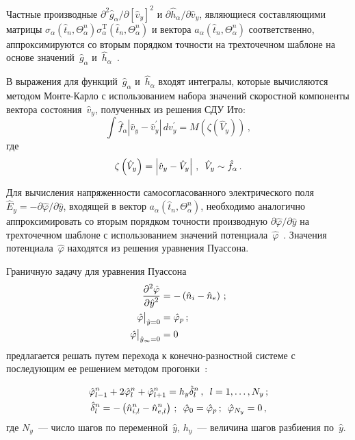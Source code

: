 \begin{multicols}{2}
Частные производные $\partial^2\hat{g}_\alpha/\partial[\hat{v}_y]^2$ и $\partial \hat{h}_\alpha/\partial 
\hat{v}_y$, являющиеся составляющими матрицы $\sigma_\alpha (\hat{t}_n, 
\Theta_\alpha^n)\sigma_\alpha^{\mathrm{T}}(\hat{t}_n,\Theta_\alpha^n)$ и вектора $a_\alpha(\hat{t}_n, 
\Theta_\alpha^n)$ соответственно, аппроксимируются со вторым порядком точности на трехточечном 
шаблоне на основе значений~$\hat{g}_\alpha$ и~$\hat{h}_\alpha$~\cite{17-k}.
      
      В выражения для функций~$\hat{g}_\alpha$ и~$\hat{h}_\alpha$ входят интегралы, которые 
вычисляются методом Мон\-те-Кар\-ло с использованием набора значений скоростной компоненты 
вектора состояния~$\hat{v}_y$, полученных из решения СДУ Ито:
      \begin{equation*}
      \int \hat{f}_\alpha \left\vert \hat{v}_y-
\hat{v}_y^\prime\right\vert\,dv_y^\prime=M\left(\zeta\left(\hat{V}_y\right)\right)\,,
\end{equation*}
где
$$
      \zeta\left(\hat{V}_y\right)=\left\vert \hat{v}_y-\hat{V}_y\right\vert\,,\enskip \hat{V}_y\sim 
\hat{f}_\alpha\,.
  $$
      
      Для вычисления напряженности самосогласованного электрического поля $\hat{E}_y=-
\partial\hat{\varphi}/\partial\hat{y}$, входящей в вектор $a_\alpha(\hat{t}_n, \Theta_\alpha^n)$, необходимо 
аналогично аппроксимировать со вторым порядком точности производную 
$\partial\hat{\varphi}/\partial\hat{y}$ на трехточечном шаблоне с использованием значений 
потенциала~$\hat{\varphi}$~\cite{17-k}. Значения потенциала~$\hat\varphi$ находятся из решения 
уравнения Пуассона. 
      
      Граничную задачу для уравнения Пуассона 
      \begin{align*}
      \displaystyle\frac{\displaystyle \partial^2 \hat\varphi\mathstrut}{\displaystyle \partial \hat{y}^2\mathstrut} & = -\left(\hat{n}_i-\hat{n}_e\right)\,;\\
      \hat{\varphi}\big|_{\hat{y}=0} &=\hat{\varphi}_p\,;\\
      \hat{\varphi}\big|_{\hat{y}_\infty=0} &=0
      \end{align*}
    предлагается решать путем перехода к конечно-разностной системе с последующим ее решением 
методом прогонки~\cite{17-k}:

\noindent
\begin{gather*}
\hat{\varphi}^n_{l-1}+2\hat{\varphi}_l^n+\hat{\varphi}^n_{l+1}=
h_y\hat{\delta}_l^n\,,\enskip l=1,\ldots , 
N_y\,;\\
\hat{\delta}_l^n=-\left( \hat{n}^n_{i,l}-\hat{n}^n_{e,l}\right)\,;\enskip 
\hat{\varphi}_0=\hat{\varphi}_p\,;\enskip \hat{\varphi}_{N_y}=0\,,
\end{gather*}
где $N_y$~--- число шагов по переменной~$\hat{y}$, $h_y$~--- величина шагов разбиения по~$\hat{y}$. 
      

\end{multicols}
